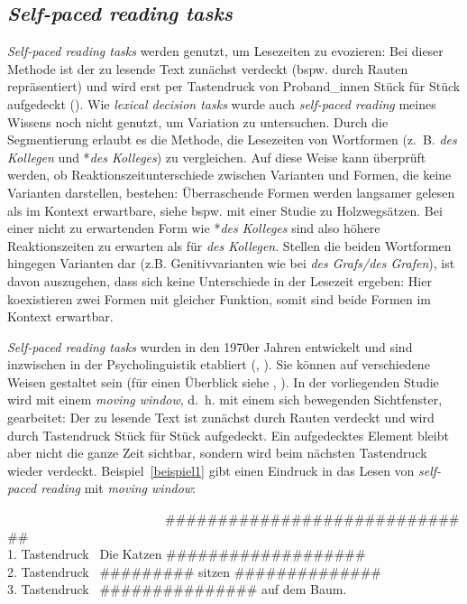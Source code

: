 \subsection{\textit{Self-paced reading tasks}}
\label{selfpaced}

\textit{Self-paced reading tasks} werden genutzt, um Lesezeiten zu evozieren: Bei dieser Methode ist der zu lesende Text zunächst verdeckt (bspw. durch Rauten repräsentiert) und wird erst per Tastendruck von Proband\_innen Stück für Stück aufgedeckt (\cite[118]{McDonough.2012}). Wie \textit{lexical decision tasks} wurde auch \textit{self-paced reading} meines Wissens noch nicht genutzt, um Variation zu untersuchen. Durch die Segmentierung erlaubt es die Methode, die Lesezeiten von Wortformen (z.~B. \textit{des Kollegen} und *\textit{des Kolleges}) zu vergleichen. Auf diese Weise kann überprüft werden, ob Reaktionszeitunterschiede zwischen Varianten und Formen, die keine Varianten darstellen, bestehen: Überraschende Formen werden langsamer gelesen als im Kontext erwartbare, siehe bspw. \textcite{Tabor.2000} mit einer Studie zu Holzwegsätzen. Bei einer nicht zu erwartenden Form wie *\textit{des Kolleges} sind also höhere Reaktionszeiten zu erwarten als für \textit{des Kollegen}. Stellen die beiden Wortformen hingegen Varianten dar (z.B. Genitivvarianten wie bei \textit{des Grafs/des Grafen}), ist davon auszugehen, dass sich keine Unterschiede in der Lesezeit ergeben: Hier koexistieren zwei Formen mit gleicher Funktion, somit sind beide Formen im Kontext erwartbar. 

\textit{Self-paced reading tasks} wurden in den 1970er Jahren entwickelt und sind inzwischen in der Psycholinguistik etabliert (\cite[18--19]{Mitchel.2013}, \cite[20--21]{Jegerski.2014}). Sie können auf verschiedene Weisen gestaltet sein (für einen Überblick siehe \cite[118--119]{McDonough.2012}, \cite[18--19]{Mitchel.2013}). In der vorliegenden Studie wird mit einem \textit{moving window}, d.~h. mit einem sich bewegenden Sichtfenster, gearbeitet: Der zu lesende Text ist zunächst durch Rauten verdeckt und wird durch Tastendruck Stück für Stück aufgedeckt. Ein aufgedecktes Element bleibt aber nicht die ganze Zeit sichtbar, sondern wird beim nächsten Tastendruck wieder verdeckt. Beispiel~\ref{beispiel1} gibt einen Eindruck in das Lesen von \textit{self-paced reading} mit \textit{moving window}:


\begin{exe} 
\ex \label{beispiel1} 
\ \ \ \ \ \ \ \ \ \ \ \ \ \ \ \ \ \ \ \ \ \ \ \ \ {\footnotesize{\#\#\#\#\#\#\#\#\#\#\#\#\#\#\#\#\#\#\#\#\#\#\#\#\#\#\#\#\#\#}} \\
1. Tastendruck \                          {\footnotesize{Die Katzen \#\#\#\#\#\#\#\#\#\#\#\#\#\#\#\#\#\#\# }}\\
2. Tastendruck \                          {\footnotesize{\#\#\#\#\#\#\#\#\# sitzen \#\#\#\#\#\#\#\#\#\#\#\#\#\# }} \\
3. Tastendruck \  												{\footnotesize{\#\#\#\#\#\#\#\#\#\#\#\#\#\#\# auf dem Baum.}} 
\end{exe}

